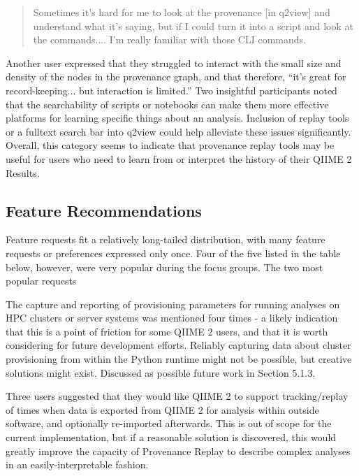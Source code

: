 \begin{quote}
Sometimes it's hard for me to look at the provenance [in q2view] and understand
what it's saying, but if I could turn it into a script and look at the
commands.... I'm really familiar with those CLI commands.
\end{quote}

\noindent Another user expressed that they struggled to interact with the small size and
density of the nodes in the provenance graph, and that therefore, “it's great
for record-keeping... but interaction is limited.” Two insightful participants
noted that the searchability of scripts or notebooks can make them more
effective platforms for learning specific things about an analysis. Inclusion of
replay tools or a fulltext search bar into q2view could help alleviate these
issues significantly. Overall, this category seems to indicate that provenance
replay tools may be useful for users who need to learn from or interpret the
history of their QIIME 2 Results.

\subsection{Feature Recommendations}

Feature requests fit a relatively long-tailed distribution, with many feature
requests or preferences expressed only once. Four of the five listed in the
table below, however, were very popular during the focus groups. The two most
popular requests

The capture and reporting of provisioning parameters for running analyses on HPC
clusters or server systems was mentioned four times - a likely indication that
this is a point of friction for some QIIME 2 users, and that it is worth
considering for future development efforts. Reliably capturing data about
cluster provisioning from within the Python runtime might not be possible, but
creative solutions might exist. Discussed as possible future work in Section
5.1.3.


Three users suggested that they would like QIIME 2 to support tracking/replay of
times when data is exported from QIIME 2 for analysis within outside software,
and optionally re-imported afterwards. This is out of scope for the current
implementation, but if a reasonable solution is discovered, this would greatly
improve the capacity of Provenance Replay to describe complex analyses in an
easily-interpretable fashion.

